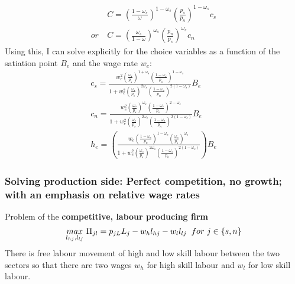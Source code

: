\begin{align*}
&C= \left(\frac{1-\omega_s}{\omega}\right)^{1-\omega_s}\left(\frac{p_s}{p_n}\right)^{1-\omega_s}c_s\\
or\ & C= \left(\frac{\omega_s}{1-\omega}\right)^{\omega_s}\left(\frac{p_n}{p_s}\right)^{\omega_s}c_n
\end{align*} 
Using this, I can solve explicitly for the choice variables as a function of the satiation point $B_e$ and the wage rate $w_e$:
\begin{align}
c_s=\frac{w_e^2\left(\frac{\omega_s}{p_s}\right)^{1+\omega_s}\left(\frac{1-\omega_s}{p_n}\right)^{1-\omega_s}}{1+w_e^2\left(\frac{\omega_s}{p_s}\right)^{2\omega_s}\left(\frac{1-\omega_s}{p_n}\right)^{2(1-\omega_s)}}B_e\\
c_n=\frac{w_e^2\left(\frac{\omega_s}{p_s}\right)^{\omega_s}\left(\frac{1-\omega_s}{p_n}\right)^{2-\omega_s}}{1+w_e^2\left(\frac{\omega_s}{p_s}\right)^{2\omega_s}\left(\frac{1-\omega_s}{p_n}\right)^{2(1-\omega_s)}}B_e\\
h_e=\left(
\frac{w_e \left(\frac{1-\omega_s}{p_n}\right)^{1-\omega_s}\left(\frac{\omega_s}{p_s}\right)^{\omega_s}}{1+w_e^2\left(\frac{\omega_s}{p_s}\right)^{2\omega_s}\left(\frac{1-\omega_s}{p_n}\right)^{2(1-\omega_s)}}\right)B_e
\end{align}

\subsubsection{Solving production side: Perfect competition, no growth; with an emphasis on relative wage rates}
Problem of the \textbf{competitive, labour producing firm}
\begin{align*}
\underset{l_{hj}, l_{lj}}{max}\  \Pi_{jl}=p_{jL}L_j-w_hl_{hj}-w_ll_{lj} \hspace{2mm} for \ j\in\{s,n\}
\end{align*}
There is free labour movement of high and low skill labour between the two sectors so that there are two wages $w_h$ for high skill labour and $w_l$ for low skill labour. 

